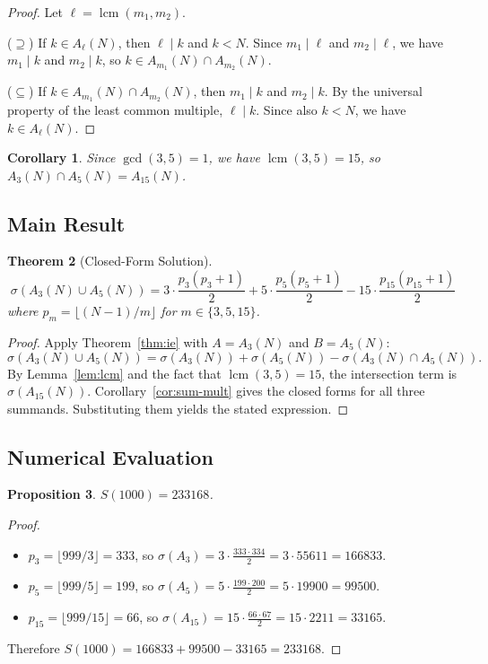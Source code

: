 \documentclass[11pt]{article}
\newtheorem{theorem}{Theorem}
\newtheorem{corollary}[theorem]{Corollary}
\newtheorem{proposition}[theorem]{Proposition}
\begin{document}
\begin{proof}
Let $\ell = \operatorname{lcm}(m_1, m_2)$.

($\supseteq$) If $k \in A_\ell(N)$, then $\ell \mid k$ and $k < N$. Since $m_1 \mid \ell$ and $m_2 \mid \ell$, we have $m_1 \mid k$ and $m_2 \mid k$, so $k \in A_{m_1}(N) \cap A_{m_2}(N)$.

($\subseteq$) If $k \in A_{m_1}(N) \cap A_{m_2}(N)$, then $m_1 \mid k$ and $m_2 \mid k$. By the universal property of the least common multiple, $\ell \mid k$. Since also $k < N$, we have $k \in A_\ell(N)$.
\end{proof}

\begin{corollary}
Since $\gcd(3,5) = 1$, we have $\operatorname{lcm}(3,5) = 15$, so $A_3(N) \cap A_5(N) = A_{15}(N)$.
\end{corollary}

\subsection{Main Result}

\begin{theorem}[Closed-Form Solution]
\label{thm:main}
\[
\sigma(A_3(N) \cup A_5(N)) = 3 \cdot \frac{p_3(p_3+1)}{2} + 5 \cdot \frac{p_5(p_5+1)}{2} - 15 \cdot \frac{p_{15}(p_{15}+1)}{2}
\]
where $p_m = \lfloor (N-1)/m \rfloor$ for $m \in \{3, 5, 15\}$.
\end{theorem}

\begin{proof}
Apply Theorem~\ref{thm:ie} with $A = A_3(N)$ and $B = A_5(N)$:
\[
\sigma(A_3(N) \cup A_5(N)) = \sigma(A_3(N)) + \sigma(A_5(N)) - \sigma(A_3(N) \cap A_5(N)).
\]
By Lemma~\ref{lem:lcm} and the fact that $\operatorname{lcm}(3,5)=15$, the intersection term is $\sigma(A_{15}(N))$. Corollary~\ref{cor:sum-mult} gives the closed forms for all three summands. Substituting them yields the stated expression.
\end{proof}

\subsection{Numerical Evaluation}

\begin{proposition}
$S(1000) = 233168$.
\end{proposition}

\begin{proof}
\begin{itemize}
    \item $p_3 = \lfloor 999/3 \rfloor = 333$, so $\sigma(A_3) = 3 \cdot \frac{333 \cdot 334}{2} = 3 \cdot 55611 = 166833$.
    \item $p_5 = \lfloor 999/5 \rfloor = 199$, so $\sigma(A_5) = 5 \cdot \frac{199 \cdot 200}{2} = 5 \cdot 19900 = 99500$.
    \item $p_{15} = \lfloor 999/15 \rfloor = 66$, so $\sigma(A_{15}) = 15 \cdot \frac{66 \cdot 67}{2} = 15 \cdot 2211 = 33165$.
\end{itemize}
Therefore $S(1000) = 166833 + 99500 - 33165 = 233168$.
\end{proof}
\end{document}
